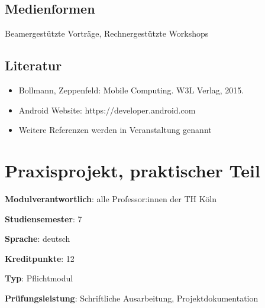 \hypertarget{medienformenpathlabel....srcmodulbeschreibungen-bachelor-bpo5ba_mobile-computing}{%
\section*{Medienformen\label{../../src/modulbeschreibungen-bachelor-bpo5/BA_Mobile-Computing}}\label{medienformenpathlabel....srcmodulbeschreibungen-bachelor-bpo5ba_mobile-computing}}

Beamergestützte Vorträge, Rechnergestützte Workshops

\hypertarget{literaturpathlabel....srcmodulbeschreibungen-bachelor-bpo5ba_mobile-computing}{%
\section*{Literatur\label{../../src/modulbeschreibungen-bachelor-bpo5/BA_Mobile-Computing}}\label{literaturpathlabel....srcmodulbeschreibungen-bachelor-bpo5ba_mobile-computing}}

\begin{itemize}
\tightlist
\item
  Bollmann, Zeppenfeld: Mobile Computing. W3L Verlag, 2015.
\item
  Android Website: https://developer.android.com
\item
  Weitere Referenzen werden in Veranstaltung genannt
\end{itemize}

\hypertarget{praxisprojekt-praktischer-teilpathlabel....srcmodulbeschreibungen-bachelor-bpo5ba_praxisprojektarbeit}{%
\chapter{Praxisprojekt, praktischer
Teil\label{../../src/modulbeschreibungen-bachelor-bpo5/BA_Praxisprojektarbeit}}\label{praxisprojekt-praktischer-teilpathlabel....srcmodulbeschreibungen-bachelor-bpo5ba_praxisprojektarbeit}}

\begin{modulHead}
\textbf{Modulverantwortlich}: alle Professor:innen
der TH Köln
\end{modulHead}
\begin{modulHead}
\textbf{Studiensemester}:
7
\end{modulHead}
\begin{modulHead}
\textbf{Sprache}:
deutsch
\end{modulHead}
\begin{modulHead}
\textbf{Kreditpunkte}:
12
\end{modulHead}
\begin{modulHead}
\textbf{Typ}:
Pflichtmodul
\end{modulHead}
\begin{modulHead}
\textbf{Prüfungsleistung}:
Schriftliche Ausarbeitung, Projektdokumentation
\end{modulHead}


